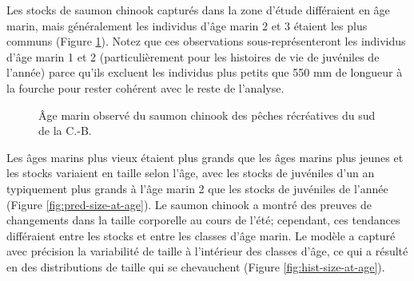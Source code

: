 Les stocks de saumon chinook capturés dans la zone d'étude différaient en âge marin, mais généralement les individus d'âge marin 2 et 3 étaient les plus communs (Figure \ref{fig:rec-age-comp}). Notez que ces observations sous-représenteront les individus d'âge marin 1 et 2 (particulièrement pour les histoires de vie de juvéniles de l'année) parce qu'ils excluent les individus plus petits que 550 mm de longueur à la fourche pour rester cohérent avec le reste de l'analyse.

\begin{figure}[htb]
    \centering
    \caption{Âge marin observé du saumon chinook des pêches récréatives du sud de la C.-B.}
    \label{fig:rec-age-comp}
\end{figure}

Les âges marins plus vieux étaient plus grands que les âges marins plus jeunes et les stocks variaient en taille selon l'âge, avec les stocks de juvéniles d'un an typiquement plus grands à l'âge marin 2 que les stocks de juvéniles de l'année (Figure \ref{fig:pred-size-at-age}). Le saumon chinook a montré des preuves de changements dans la taille corporelle au cours de l'été; cependant, ces tendances différaient entre les stocks et entre les classes d'âge marin. Le modèle a capturé avec précision la variabilité de taille à l'intérieur des classes d'âge, ce qui a résulté en des distributions de taille qui se chevauchent (Figure \ref{fig:hist-size-at-age}). 

